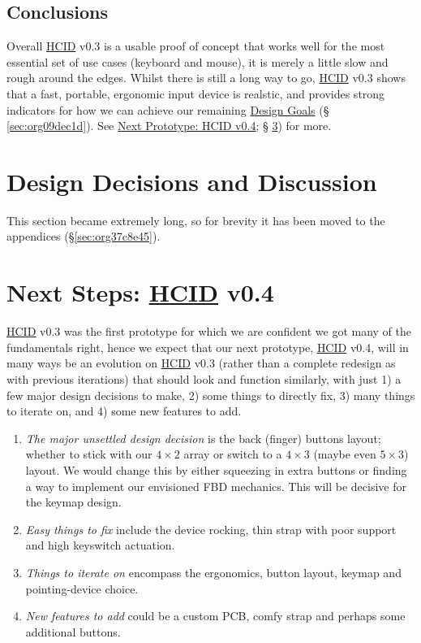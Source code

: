 \documentclass[logo,bsc,singlespacing,parskip]{infthesis}
\begin{document}
\section{Conclusions}
\label{sec:orgec99d96}
Overall \hyperref[org30e2275]{HCID} v0.3 is a usable proof of concept that works well for the most essential set of use cases (keyboard and mouse), it is merely a little slow and rough around the edges.
Whilst there is still a long way to go, \hyperref[org30e2275]{HCID} v0.3 shows that a fast, portable, ergonomic input device is realstic, and provides strong indicators for how we can achieve our remaining \hyperref[sec:org09dec1d]{Design Goals} (§ \ref{sec:org09dec1d}). See \hyperref[sec:orgeda2f4c]{Next Prototype: HCID v0.4}; § \ref{sec:orgeda2f4c}) for more.
\chapter{Design Decisions and Discussion}
\label{sec:org87a20d9}
This section became extremely long, so for brevity it has been moved to the appendices (\S \ref{sec:org37c8e45}).

\chapter{Next Steps: \hyperref[org30e2275]{HCID} v0.4}
\label{sec:orgeda2f4c}
\hyperref[org30e2275]{HCID} v0.3 was the first prototype for which we are confident we got  many of the fundamentals right, hence we expect that our next prototype,  \hyperref[org30e2275]{HCID} v0.4, will in many ways be an evolution on \hyperref[org30e2275]{HCID} v0.3 (rather than a complete redesign as with previous iterations) that should look and function similarly, with just 1) a few major design decisions to make, 2) some things to directly fix, 3) many things to iterate on, and  4) some new features to add.

\begin{enumerate}
\item \emph{The major unsettled design decision} is the back (finger) buttons layout; whether to stick with our \(4\times2\) array or switch to a \(4\times3\) (maybe even \(5\times3\)) layout.
We would change this by either squeezing in extra buttons or finding a way to implement our envisioned FBD mechanics. This will be decisive for the keymap design.

\item \emph{Easy things to fix} include the device rocking, thin strap with poor support and high keyswitch actuation.

\item \emph{Things to iterate on} encompass the ergonomics, button layout, keymap and pointing-device choice.

\item \emph{New features to add} could be a custom PCB, comfy strap and perhaps some additional buttons.
\end{enumerate}
\iffalse
\end{document}
